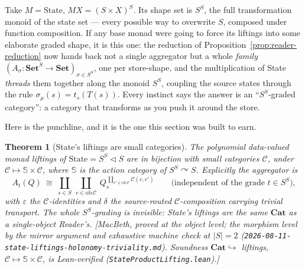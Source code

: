 \documentclass[11pt,a4paper]{book}
\newcommand{\Set}{\mathbf{Set}}
\newcommand{\Cat}{\mathbf{Cat}}
\newcommand{\cont}[2]{#1 \triangleleft #2}
\newcommand{\ob}{\mathrm{ob}\,}
\theoremstyle{plain}
\newtheorem{Theorem}{Theorem}[chapter]
\theoremstyle{definition}
\theoremstyle{remark}
\newcommand{\prov}[1]{\hfill\textsf{\footnotesize[#1]}}
\begin{document}
Take $M=\text{State}$, $MX=(S\times X)^{S}$. Its shape set is $S^{S}$, the full transformation monoid
of the state set --- every possible way to overwrite $S$, composed under function composition. If any
base monad were going to force its liftings into some elaborate graded shape, it is this one: the
reduction of Proposition~\ref{prop:reader-reduction} now hands back not a single aggregator but a
whole \emph{family} $(A_{\sigma}\colon\Set^{S}\to\Set)_{\sigma\in S^{S}}$, one per store-shape, and
the multiplication of State \emph{threads} them together along the monoid $S^{S}$, coupling the source
states through the rule $\sigma_{\mu}(s)=t_{s}(T(s))$. Every instinct says the answer is an
``$S^{S}$-graded category'': a category that transforms as you push it around the store.

Here is the punchline, and it is the one this section was built to earn.

\begin{Theorem}[State's liftings are small categories]\label{thm:state-classification}
The polynomial data-valued monad liftings of $\text{State}=\cont{S^{S}}{S}$ are in bijection with
small categories $\mathcal C$, under $\mathcal C\mapsto\mathbb S\times\mathcal C$, where $\mathbb S$ is
the action category of $S^{S}\curvearrowright S$. Explicitly the aggregator is
\[
   A_{t}(Q)\ \cong\ \coprod_{s\in S}\ \coprod_{c\in\ob\mathcal C}\
        Q_{s}^{\,\coprod_{c'\in\ob\mathcal C}\mathcal C(c,c')}
   \qquad\text{(independent of the grade $t\in S^{S}$),}
\]
with $\varepsilon$ the $\mathcal C$-identities and $\delta$ the source-routed $\mathcal C$-composition
carrying \emph{trivial} transport. The whole $S^{S}$-grading is invisible: State's liftings are the
\emph{same} $\Cat$ as a single-object Reader's.
\prov{MacBeth, proved at the object level; the morphism level by the mirror argument and exhaustive
machine check at $|S|=2$ (\texttt{2026-08-11-state-liftings-holonomy-triviality.md}). Soundness
$\Cat\hookrightarrow$ liftings, $\mathcal C\mapsto\mathbb S\times\mathcal C$, is Lean-verified
(\texttt{StateProductLifting.lean}).}
\end{Theorem}
\end{document}
